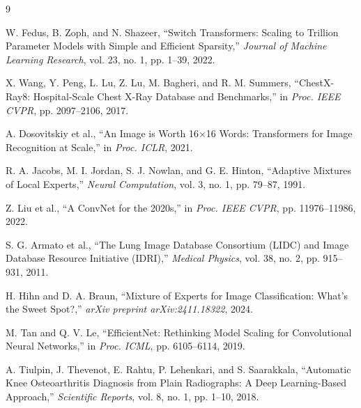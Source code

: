 \documentclass[11pt, a4paper]{article}
\begin{document}

\small
\setlength{\bibsep}{2pt}
\begin{thebibliography}{9}

W. Fedus, B. Zoph, and N. Shazeer,
``Switch Transformers: Scaling to Trillion Parameter Models with Simple and Efficient Sparsity,''
\textit{Journal of Machine Learning Research}, vol. 23, no. 1, pp. 1--39, 2022.

X. Wang, Y. Peng, L. Lu, Z. Lu, M. Bagheri, and R. M. Summers,
``ChestX-Ray8: Hospital-Scale Chest X-Ray Database and Benchmarks,''
in \textit{Proc. IEEE CVPR}, pp. 2097--2106, 2017.

A. Dosovitskiy et al.,
``An Image is Worth 16$\times$16 Words: Transformers for Image Recognition at Scale,''
in \textit{Proc. ICLR}, 2021.

R. A. Jacobs, M. I. Jordan, S. J. Nowlan, and G. E. Hinton,
``Adaptive Mixtures of Local Experts,''
\textit{Neural Computation}, vol. 3, no. 1, pp. 79--87, 1991.

Z. Liu et al.,
``A ConvNet for the 2020s,''
in \textit{Proc. IEEE CVPR}, pp. 11976--11986, 2022.

S. G. Armato et al.,
``The Lung Image Database Consortium (LIDC) and Image Database Resource Initiative (IDRI),''
\textit{Medical Physics}, vol. 38, no. 2, pp. 915--931, 2011.

H. Hihn and D. A. Braun,
``Mixture of Experts for Image Classification: What's the Sweet Spot?,''
\textit{arXiv preprint arXiv:2411.18322}, 2024.

M. Tan and Q. V. Le,
``EfficientNet: Rethinking Model Scaling for Convolutional Neural Networks,''
in \textit{Proc. ICML}, pp. 6105--6114, 2019.

A. Tiulpin, J. Thevenot, E. Rahtu, P. Lehenkari, and S. Saarakkala,
``Automatic Knee Osteoarthritis Diagnosis from Plain Radiographs: A Deep Learning-Based Approach,''
\textit{Scientific Reports}, vol. 8, no. 1, pp. 1--10, 2018.

\end{thebibliography}
\end{document}
